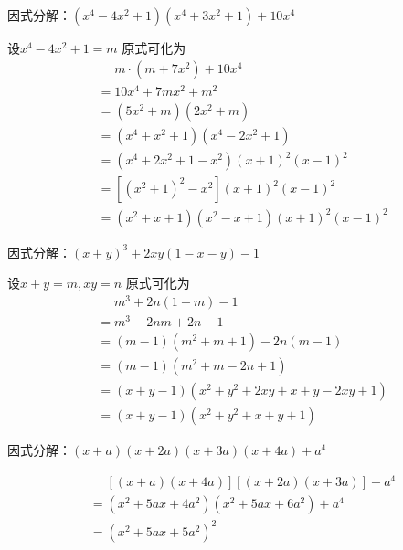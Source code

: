 \documentclass[windows,csize4,answers]{BHCexam}
\begin{document}
\begin{groups}
\begin{questions}[]
        \question[5] 因式分解：$(x^4-4x^2+1)(x^4+3x^2+1)+10x^4$
        \begin{solution}{0.5cm}
            \methodonly 设$x^4-4x^2+1=m$ 原式可化为
            \[
                \begin{aligned}
                     & \phantom{=}m\cdot (m+7x^2)+10x^4   \\
                     & = 10x^4 + 7mx^2 + m^2              \\
                     & = (5x^2+m)(2x^2+m)                 \\
                     & = (x^4 + x^2+1)(x^4-2x^2+1)        \\
                     & = (x^4+2x^2+1-x^2)(x+1)^2(x-1)^2   \\
                     & = [(x^2+1)^2 -x^2](x+1)^2(x-1)^2   \\
                     & = (x^2+x+1)(x^2-x+1)(x+1)^2(x-1)^2
                \end{aligned}
            \]
        \end{solution}
        \vspace{3.5cm}


        \question[5] 因式分解：$(x+y)^3+2xy(1-x-y)-1$
        \begin{solution}{0.5cm}
            \methodonly 设$x+y=m,xy=n$ 原式可化为
            \[
                \begin{aligned}
                     & \phantom{=}m^3+2n(1-m)-1         \\
                     & = m^3-2nm+2n-1                   \\
                     & = (m-1)(m^2+m+1) -2n(m-1)        \\
                     & = (m-1)(m^2+m-2n+1)              \\
                     & = (x+y-1)(x^2+y^2+2xy+x+y-2xy+1) \\
                     & = (x+y-1)(x^2+y^2+x+y+1)
                \end{aligned}
            \]
        \end{solution}
        \vspace{3.5cm}

        \question[5] 因式分解：$(x+a)(x+2a)(x+3a)(x+4a)+a^4$
        \begin{solution}{0.5cm}
            \methodonly
            \[
                \begin{aligned}
                     & \phantom{=}[(x+a)(x+4a)][(x+2a)(x+3a)] + a^4 \\
                     & = (x^2+5ax+4a^2)(x^2+5ax+6a^2)+a^4           \\
                     & = (x^2+5ax+5a^2)^2
                \end{aligned}
            \]
        \end{solution}
        \vspace{3.5cm}


\end{questions}
\end{groups}
\end{document}
